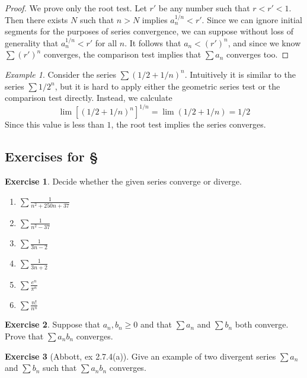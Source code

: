 \documentclass[11pt,oneside]{amsbook}
\theoremstyle{definition}
\newtheorem{exerc}{Exercise}[section]
\theoremstyle{plain}
\theoremstyle{definition}
\theoremstyle{remark}
\newtheorem{example}[thm]{Example}
\numberwithin{equation}{section}
\numberwithin{figure}{section}
\begin{document}
\begin{proof}
  We prove only the root test. Let $r'$ be any number such that $r<r'<1$. Then there exists $N$ such that $n>N$ implies $a_n^{1/n}<r'$. Since we can ignore initial segments for the purposes of series convergence, we can suppose without loss of generality that $a_n^{1/n}<r'$ for all $n$. It follows that $a_n<(r')^n$, and since we know $\sum(r')^n$ converges, the comparison test implies that $\sum a_n$ converges too.
\end{proof}

\begin{example}
  Consider the series $\sum(1/2+1/n)^n$. Intuitively it is similar to the series $\sum1/2^n$, but it is hard to apply either the geometric series test or the comparison test directly. Instead, we calculate
  \[\lim[(1/2+1/n)^n]^{1/n}=\lim(1/2+1/n)=1/2
  \]
  Since this value is less than $1$, the root test implies the series converges.
\end{example}

\newpage
\subsection*{Exercises for \S \thesection}

\begin{exerc}
  Decide whether the given series converge or diverge.
  \begin{enumerate}
    \item $\displaystyle\sum\frac{1}{n^2+250n+37}$
    \item $\displaystyle\sum\frac{1}{n^2-37}$
    \item $\displaystyle\sum\frac{1}{3n-2}$
    \item $\displaystyle\sum\frac{1}{3n+2}$
    \item $\displaystyle\sum\frac{e^n}{\pi^n}$
    \item $\displaystyle\sum\frac{n!}{n^n}$
  \end{enumerate}
\end{exerc}

\begin{exerc}  
  Suppose that $a_n,b_n\geq0$ and that $\sum a_n$ and $\sum b_n$ both converge. Prove that $\sum a_nb_n$ converges.
\end{exerc}

\begin{exerc}[Abbott, ex 2.7.4(a)]
  Give an example of two divergent series $\sum a_n$ and $\sum b_n$ such that $\sum a_nb_n$ converges.
\end{exerc}
\end{document}
